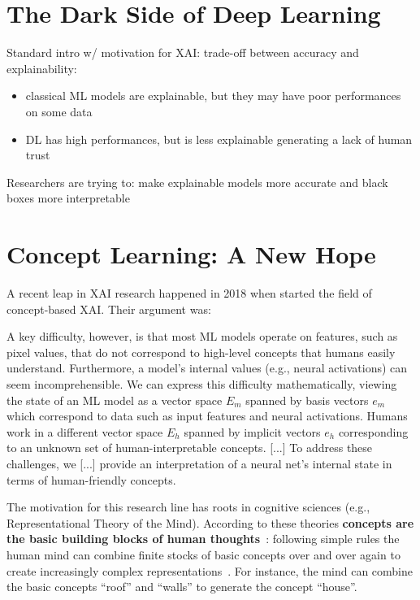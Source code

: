 \documentclass[withindex,glossary]{cam-thesis}
\theoremstyle{plain}
\theoremstyle{definition}
\theoremstyle{remark}
\begin{document}
\section{The Dark Side of Deep Learning}
Standard intro w/ motivation for XAI: trade-off between accuracy and explainability: 
\begin{itemize}
    \item classical ML models are explainable, but they may have poor performances on some data
    \item DL has high performances, but is less explainable generating a lack of human trust
\end{itemize}

Researchers are trying to: make explainable models more accurate and black boxes more interpretable


\section{Concept Learning: A New Hope}
A recent leap in XAI research happened in 2018 when \citet{kim2018interpretability} started the field of concept-based XAI. Their argument was:

\begin{displayquote}
A key difficulty, however, is that most ML models operate on features, such as pixel values, that do not correspond to high-level concepts that humans easily understand. Furthermore, a model’s internal values (e.g., neural activations) can seem incomprehensible. We can express this difficulty mathematically, viewing the state of an ML model as a vector space $E_m$ spanned by basis vectors $e_m$ which correspond to data such as input features and neural activations. Humans work in a different vector space $E_h$ spanned by implicit vectors $e_h$ corresponding to an unknown set of human-interpretable concepts. [...] To address these challenges, we [...] provide an interpretation of a neural net’s internal state in terms of human-friendly concepts.
\end{displayquote}

The motivation for this research line has roots in cognitive sciences (e.g., Representational Theory of the Mind). According to these theories \textbf{concepts are the basic building blocks of human thoughts}~\citep{margolis2007ontology}: following simple rules the human mind can combine finite stocks of basic concepts over and over again to create increasingly complex representations~\citep{margolis2007ontology}. For instance, the mind can combine the basic concepts ``roof'' and ``walls'' to generate the concept ``house''. 
\end{document}
